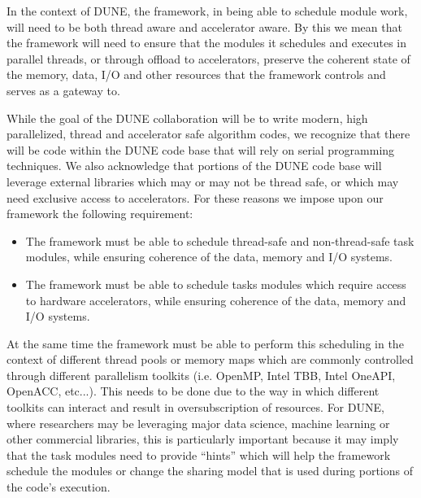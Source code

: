 \documentclass[../main-v1.tex]{subfiles}
\begin{document}
In the context of DUNE, the framework, in being able to schedule module work, will need to be both thread aware and accelerator aware.  By this we mean that the framework will need to ensure that the modules it schedules and executes in parallel threads, or through offload to accelerators, preserve the coherent state of the memory, data, I/O and other resources that the framework controls and serves as a gateway to.  

While the goal of the DUNE collaboration will be to write modern, high parallelized, thread and accelerator safe algorithm codes, we recognize that there will be code within the DUNE code base that will rely on serial programming techniques.  We also acknowledge that portions of the DUNE code base will leverage external libraries which may or may not be thread safe, or which may need exclusive access to accelerators.  For these reasons we impose upon our framework the following requirement: 

\begin{itemize}

\item The framework must be able to schedule thread-safe and non-thread-safe task modules, while ensuring coherence of the data, memory and I/O systems.  
\end{itemize}

\begin{itemize}

\item The framework must be able to schedule tasks modules which require access to hardware accelerators, while ensuring coherence of the data, memory and I/O systems.  
\end{itemize}

At the same time the framework must be able to perform this scheduling in the context of different thread pools or memory maps which are commonly controlled  through different parallelism toolkits (i.e. OpenMP, Intel TBB, Intel OneAPI, OpenACC, etc...).  This needs to be done due to the way in which different toolkits can interact and result in oversubscription of resources.   For DUNE, where researchers may be leveraging major data science, machine learning or other commercial libraries, this is particularly important because it may imply that the task modules need to provide ``hints'' which will help the framework schedule the modules or change the sharing model that is used during portions of the code's execution.
\end{document}
